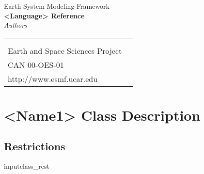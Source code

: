 \documentclass[]{article}
\begin{document}

\begin{titlepage}

\begin{center}
{\Large Earth System Modeling Framework } \\
\vspace{.25in}
{\Large {\bf <Module, Library, Component or Model Name> <Language> Reference}} \\
\vspace{.25in}
{\large {\it Authors}}
\vspace{.5in}
\end{center}

\begin{latexonly}
\vspace{5.5in}
\begin{tabular}{p{5in}p{.9in}}
\hrulefill \\
\noindent {\bf NASA High Performance Computing and Communications Program} \\
\noindent Earth and Space Sciences Project \\
\noindent CAN 00-OES-01 \\
\noindent http://www.esmf.ucar.edu \\
\end{tabular}
\end{latexonly}

\end{titlepage}

\tableofcontents

\newpage




\section{<Name1> Class Description}


\subsection{Restrictions}
input{class_rest}
\end{document}

